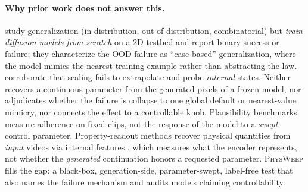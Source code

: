 \begin{center}
\end{center}

\paragraph{Why prior work does not answer this.}
\citet{kang2025howfar} study generalization (in-distribution, out-of-distribution,
combinatorial) but \emph{train diffusion models from scratch} on a 2D testbed
and report binary success or failure; they characterize the OOD failure as
``case-based'' generalization, where the model mimics the nearest training
example rather than abstracting the law. \citet{invisiblehand2026} corroborate
that scaling fails to extrapolate and probe \emph{internal} states. Neither
recovers a continuous parameter from the generated pixels of a frozen model,
nor adjudicates whether the failure is collapse to one global default or
nearest-value mimicry, nor connects the effect to a controllable knob.
Plausibility benchmarks \citep{motamed2025physicsiq,zhang2025morpheus,bansal2025videophy2,vbench2_2025}
measure adherence on fixed clips, not the response of the model to a
\emph{swept} control parameter. Property-readout methods recover physical
quantities from \emph{input} videos via internal features
\citep{inferring2025dynamic,invisiblehand2026}, which measures what the
encoder represents, not whether the \emph{generated} continuation honors a
requested parameter. \textsc{PhysWeep} fills the gap: a black-box,
generation-side, parameter-swept, label-free test that also names the failure
mechanism and audits models claiming controllability.

